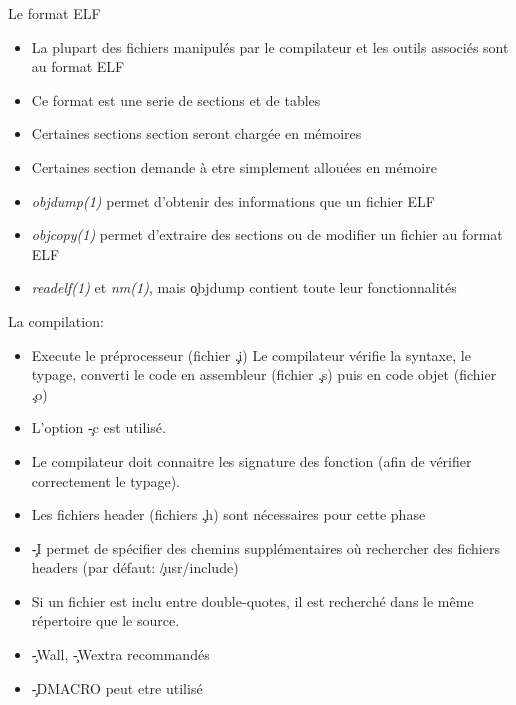 \begin{frame}[fragile=singleslide]{ Le format ELF}
  \begin{itemize} 
  \item La  plupart des fichiers  manipulés par le compilateur  et les
    outils associés sont au format ELF
  \item Ce format est une serie de sections et de tables
  \item  Certaines sections section seront chargée en mémoires
  \item  Certaines  section  demande  à etre  simplement  allouées  en
    mémoire
  \item  \emph{objdump(1)} permet  d'obtenir des  informations  que un
    fichier ELF
  \item  \emph{objcopy(1)}  permet   d'extraire  des  sections  ou  de
    modifier un fichier au format ELF
  \item \emph{readelf(1)}  et \emph{nm(1)}, mais  \c{objdump} contient
    toute leur fonctionnalités
  \end{itemize} 
  La compilation:
  \begin{itemize} 
  \item  Execute  le  préprocesseur  (fichier \c{.i})  Le  compilateur
    vérifie  la syntaxe,  le typage,  converti le  code  en assembleur
    (fichier \c{.s}) puis en code objet (fichier \c{.o})
  \item L'option \c{-c} est utilisé.
  \item Le compilateur doit connaitre les signature des fonction (afin
    de vérifier correctement le typage).
  \item Les  fichiers header  (fichiers \c{.h}) sont  nécessaires pour
    cette phase
  \item  \c{-I} permet  de  spécifier des  chemins supplémentaires  où
    rechercher des fichiers headers (par défaut: \c{/usr/include})
  \item Si un fichier est  inclu entre double-quotes, il est recherché
    dans le même répertoire que le source.
  \item \c{-Wall}, \c{-Wextra} recommandés
  \item \c{-DMACRO} peut etre utilisé
  \end{itemize}
\end{frame} 

